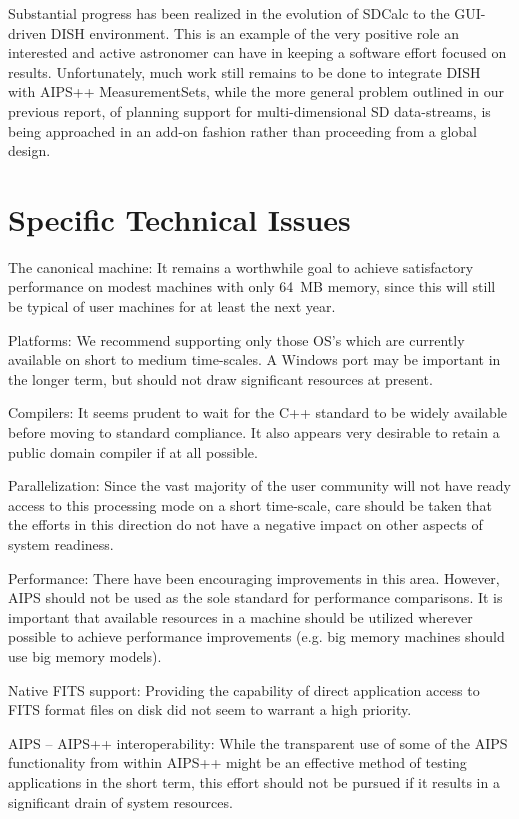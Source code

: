 Substantial progress has been realized in the evolution of SDCalc to
the GUI-driven DISH environment. This is an example of the very
positive role an interested and active astronomer can have in keeping
a software effort focused on results. Unfortunately, much work still
remains to be done to integrate DISH with AIPS++ MeasurementSets,
while the more general problem outlined in our previous report, of
planning support for multi-dimensional SD data-streams, is being
approached in an add-on fashion rather than proceeding from a global
design.

\section{Specific Technical Issues}

The canonical machine: It remains a worthwhile goal to achieve
satisfactory performance on modest machines with only 64~MB memory,
since this will still be typical of user machines for at least the
next year.

Platforms: We recommend supporting only those OS's which are currently
available on short to medium time-scales.  A Windows port may be
important in the longer term, but should not draw significant
resources at present.

Compilers: It seems prudent to wait for the C++ standard to be widely
available before moving to standard compliance. It also appears very
desirable to retain a public domain compiler if at all possible.

Parallelization: Since the vast majority of the user community will
not have ready access to this processing mode on a short time-scale,
care should be taken that the efforts in this direction do not have a
negative impact on other aspects of system readiness.

Performance: There have been encouraging improvements in this area.
However, AIPS should not be used as the sole standard for performance
comparisons. It is important that available resources in a machine
should be utilized wherever possible to achieve performance improvements
(e.g. big memory machines should use big memory models).

Native FITS support: Providing the capability of direct application
access to FITS format files on disk did not seem to warrant a high
priority. 

AIPS -- AIPS++ interoperability: While the transparent use of some of
the AIPS functionality from within AIPS++ might be an effective method
of testing applications in the short term, this effort should not be
pursued if it results in a significant drain of system resources.


